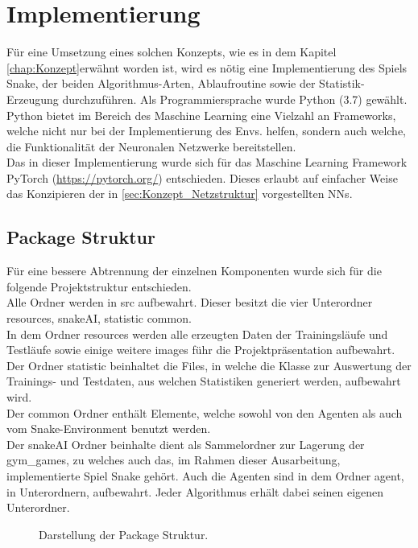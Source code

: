 \chapter{Implementierung} \label{chap:Implementierung}
\graphicspath{{Abbildungen/Implementierung/}}
Für eine Umsetzung eines solchen Konzepts, wie es in dem Kapitel \ref{chap:Konzept}erwähnt worden ist, wird es nötig eine Implementierung des Spiels Snake, der beiden Algorithmus-Arten, Ablaufroutine sowie der Statistik-Erzeugung durchzuführen. Als Programmiersprache wurde Python (3.7) gewählt.\\
Python bietet im Bereich des Maschine Learning eine Vielzahl an Frameworks, welche nicht nur bei der Implementierung des Envs. helfen, sondern auch welche, die Funktionalität der Neuronalen Netzwerke bereitstellen.\\
Das in dieser Implementierung wurde sich für das Maschine Learning Framework PyTorch (\url{https://pytorch.org/}) entschieden. Dieses erlaubt auf einfacher Weise das Konzipieren der in \ref{sec:Konzept_Netzstruktur} vorgestellten NNs.

\section{Package Struktur}
Für eine bessere Abtrennung der einzelnen Komponenten wurde sich für die folgende Projektstruktur entschieden. 
\\Alle Ordner werden in src aufbewahrt. Dieser besitzt die vier Unterordner resources, snakeAI, statistic common.\\
In dem Ordner resources werden alle erzeugten Daten der Trainingsläufe und Testläufe sowie einige weitere images führ die Projektpräsentation aufbewahrt.\\
Der Ordner statistic beinhaltet die Files, in welche die Klasse zur Auswertung der Trainings- und Testdaten, aus welchen Statistiken generiert werden, aufbewahrt wird.\\
Der common Ordner enthält Elemente, welche sowohl von den Agenten als auch vom Snake-Environment benutzt werden.\\
Der snakeAI Ordner beinhalte dient als Sammelordner zur Lagerung der gym\_games, zu welches auch das, im Rahmen dieser Ausarbeitung, implementierte Spiel Snake gehört. Auch die Agenten sind in dem Ordner agent, in Unterordnern, aufbewahrt. Jeder Algorithmus erhält dabei seinen eigenen Unterordner.
\begin{figure}[H]
	\centering
	\def\svgscale{0.1}
	
	\caption[Package Struktur]{Darstellung der Package Struktur.}
	\label{fig:Package_Struktur}
\end{figure}


